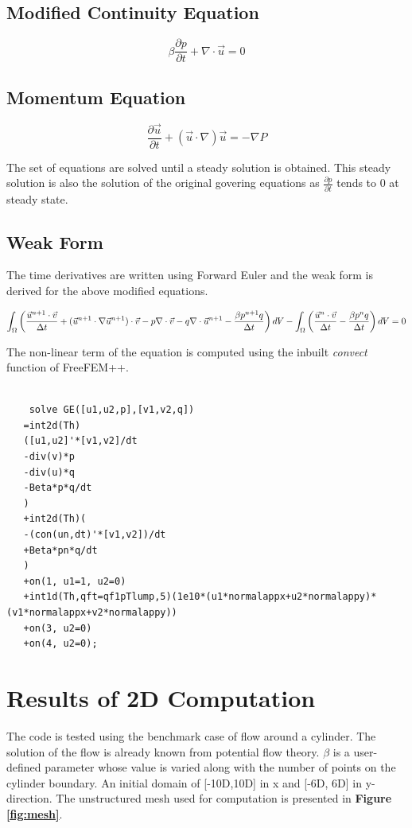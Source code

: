 \documentclass{article}
\newcommand{\Vol}{\rotatebox[origin=c]{180}{\ensuremath{A}}}
\begin{document}
\subsection*{Modified Continuity Equation}
$$\beta \frac{\partial{p}}{\partial{t}} + \nabla \cdot \vec{u}  = 0$$

\subsection*{Momentum Equation}
$$ \frac{\partial{\vec{u}}}{\partial{t}} + (\vec{u} \cdot \nabla) \vec{u} = - \nabla P $$

\noindent The set of equations are solved until a steady solution is obtained. This steady solution
is also the solution of the original govering equations as $\frac{\partial{p}}{\partial{t}}$ tends
to 0 at steady state.\\

\subsection*{Weak Form}
The time derivatives are written using Forward Euler and the weak form is derived
for the above modified equations.

$$\int_{\Omega} \left( \frac{\vec{u}^{n+1}\cdot\vec{v}}{\Delta t} + (\vec{u}^{n+1} \cdot \nabla\vec{u}^{n+1})\cdot\vec{v} - p\nabla \cdot\vec{v} - q\nabla \cdot \vec{u}^{n+1}
    - \frac{\beta p^{n+1} q}{\Delta t}\right) d\Vol - \int_{\Omega} \left(\frac{\vec{u}^{n}\cdot\vec{v}}{\Delta t} - \frac{\beta p^{n} q}{\Delta t}\right) d\Vol = 0$$

\noindent The non-linear term of the equation is computed using the inbuilt \emph{convect} function of FreeFEM++.

\begin{lstlisting}[language=FreeFem, caption=Problem definition in FreeFEM++]

    solve GE([u1,u2,p],[v1,v2,q])
   =int2d(Th)
   ([u1,u2]'*[v1,v2]/dt
   -div(v)*p
   -div(u)*q
   -Beta*p*q/dt
   )
   +int2d(Th)(
   -(con(un,dt)'*[v1,v2])/dt
   +Beta*pn*q/dt   
   )
   +on(1, u1=1, u2=0)
   +int1d(Th,qft=qf1pTlump,5)(1e10*(u1*normalappx+u2*normalappy)*(v1*normalappx+v2*normalappy))
   +on(3, u2=0)
   +on(4, u2=0);
\end{lstlisting}

\section{Results of 2D Computation}
The code is tested using the benchmark case of flow around a cylinder. The solution of the flow is already known
from potential flow theory. $\beta$ is a user-defined parameter whose value is varied along with the number of points
on the cylinder boundary. An initial domain of [-10D,10D] in x and [-6D, 6D] in y-direction. The unstructured
mesh used for computation is presented in \textbf{Figure \ref{fig:mesh}}.
\end{document}
